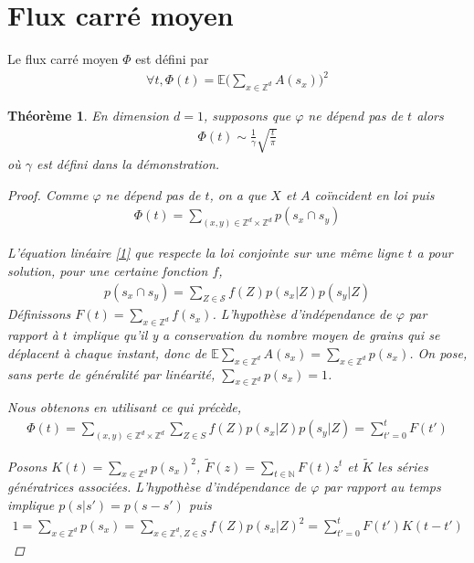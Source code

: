\documentclass{article}
\newtheorem{theorem}{Théorème}[section]
\theoremstyle{definition}
\begin{document}
\section{Flux carré moyen}
Le flux carré moyen $\Phi$ est défini par 
\begin{align*}
	\forall t, \Phi(t) = \mathbb{E}\bigg(\sum_{x\in\mathbb{Z}^d}A(s_x)\bigg)^2 
\end{align*}

\begin{theorem}
	En dimension $d=1$, supposons que $\varphi$ ne dépend pas de $t$
	alors \begin{align*}
		\Phi(t) \sim \frac{1}{\gamma}\sqrt{\frac{t}{\pi}}
	\end{align*}
	où $\gamma$ est défini dans la démonstration.
	\begin{proof}
		Comme $\varphi$ ne dépend pas de $t$, on a que $X$ et $A$ coïncident en loi puis \begin{align*}
			\Phi(t) = \sum_{(x,y)\in\mathbb{Z}^d\times\mathbb{Z}^d} p(s_x \cap s_y)
		\end{align*}

		L'équation linéaire \eqref{1} que respecte la loi conjointe sur une même ligne $t$ a pour solution, pour une certaine fonction $f$, 
\begin{align*}
	p(s_x\cap s_y) = \sum_{Z\in \mathcal{S}} f(Z) p(s_x|Z)p(s_y|Z)
\end{align*}
Définissons $F(t) = \sum_{x\in\mathbb{Z}^d}f(s_x)$. L'hypothèse d'indépendance de $\varphi$ par rapport à $t$ implique qu'il y a conservation du nombre moyen de grains qui se déplacent à chaque instant, donc de $\mathbb{E}\sum_{x\in\mathbb{Z}^d}A(s_x)=\sum_{x\in\mathbb{Z}^d}p(s_x)$. On pose, sans perte de généralité par linéarité, $\sum_{x\in\mathbb{Z}^d}p(s_x) = 1$.

Nous obtenons en utilisant ce qui précède,
\begin{align*}
	\Phi(t) = \sum_{(x,y)\in\mathbb{Z}^d\times\mathbb{Z}^d}\sum_{Z\in S} f(Z)p(s_x|Z)p(s_y|Z) = \sum_{t'=0}^t F(t')
\end{align*}

Posons $K(t) = \sum_{x\in\mathbb{Z}^d} p(s_x)^2$, $\tilde{F}(z) = \sum_{t\in \mathbb{N}}F(t) z^t$ et $\tilde{K}$ les séries génératrices associées. L'hypothèse d'indépendance de $\varphi$ par rapport au temps implique $p(s|s')=p(s-s')$ puis
\begin{align*}
	1 = \sum_{x\in\mathbb{Z}^d}p(s_x) = \sum_{x\in\mathbb{Z}^d, Z\in S}f(Z)p(s_x|Z)^2 = \sum_{t'=0}^t F(t')K(t-t')
\end{align*}


\end{proof}
\end{theorem}
\end{document}

